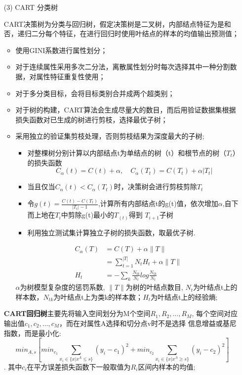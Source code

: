 \documentclass[a4paper]{article}
\begin{document}
\begin{enumerate}
\begin{itemize}
				\item[(3)] CART 分类树\par
					CART决策树为分类与回归树，假定决策树是二叉树，内部结点特征为是和否，递归二分每个特征，在进行回归时使用叶结点的样本的均值输出预测值；
					\begin{itemize}
						\item 使用GINI系数进行属性划分；
						\item 对于连续属性采用多次二分法，离散属性划分时每次选择其中一种分割数据，对属性特征重复性使用；
						\item 对于多分类目标，会将目标类别合并成两个超类别；
						\item 对于树的构建，CART算法会生成尽量大的数目，而后用验证数据集根据损失函数对已生成的树进行剪枝，选择最优子树；
						\item 采用独立的验证集剪枝处理，否则剪枝结果为深度最大的子树;
							\begin{itemize}
								\item 对整棵树分别计算以内部结点t为单结点的树（t）和根节点的树（$T_t$）的损失函数
									$$C_\alpha(t) = C(t)+\alpha,\quad C_\alpha(T_t) = C(T_t)+\alpha|T_t|$$
								\item 当且仅当$C_\alpha(t)<C_\alpha(T_t)$时，决策树会进行剪枝剪除$T_t$
								\item 令$g(t) = \frac{C(t)-C(T_t)}{|T_t|-1}$,计算所有内部结点t的g(t)值，依次增加$\alpha$,自下而上地在$T_i$中剪除g(t)最小的$T_(t)$得到
								$T_{i+1}$子树
								\item 利用独立测试集计算独立子树的损失函数，取最优子树.
							\end{itemize}
						\begin{align*}
								C_{\alpha}(T) & = C(T) + \alpha\|T\|\\
											& = \sum_{t=1}^{|T|}N_tH_t + \alpha\|T\|\\
										H_t	& = -\sum_k\frac{N_{tk}}{N_t}log\frac{N_{tk}}{N_t}
							\end{align*}
						$\alpha$为树模型复杂度的惩罚系数, $\|T\|$为树的叶结点数目, $N_t$为叶结点t上的样本数，$N_{tk}$为叶结点t上为类k的样本数；$H_t$为叶结点t上的经验熵;	
					\end{itemize}
					\textbf{CART回归树}主要先将输入空间划分为M个空间$R_1,R_2,\dots,R_M$, 每个空间对应输出值$c_1,c_2,\dots,c_M$，而在对属性A选择和切分点v时不是选择
					信息增益或基尼指数，而是最小化:
					$$min_{A,s}[min_{c_1}\sum_{x_i\in \{x|x^A\leq s\}}(y_i-c_1)^2+min_{c_2}\sum_{x_i\in \{x|x^A\geq s\}}(y_i-c_2)^2]$$.
					其中$c_i$在平方误差损失函数下一般取值为$R_i$区间内样本的均值;


\end{itemize}
\end{enumerate}
\end{document}
